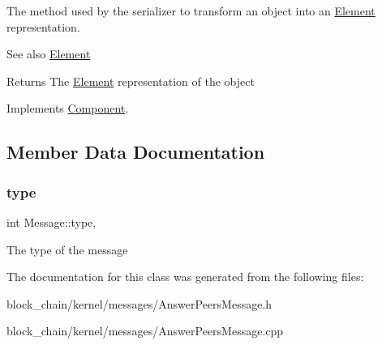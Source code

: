 The method used by the serializer to transform an object into an \mbox{\hyperlink{classElement}{Element}} representation. \begin{DoxySeeAlso}{See also}
\mbox{\hyperlink{classElement}{Element}}
\end{DoxySeeAlso}
\begin{DoxyReturn}{Returns}
The \mbox{\hyperlink{classElement}{Element}} representation of the object 
\end{DoxyReturn}


Implements \mbox{\hyperlink{classComponent_a3e63d8c993e417a4af3f56d65ebfc7ea}{Component}}.



\subsection{Member Data Documentation}
\mbox{\label{classMessage_afbfb481c98b13d0deba0bac443bebe29}} 
\subsubsection{\texorpdfstring{type}{type}}
{\footnotesize\ttfamily int Message\+::type\hspace{0.3cm}{\ttfamily [protected]}, {\ttfamily [inherited]}}

The type of the message 

The documentation for this class was generated from the following files\+:\begin{DoxyCompactItemize}
\item 
block\+\_\+chain/kernel/messages/Answer\+Peers\+Message.\+h\item 
block\+\_\+chain/kernel/messages/Answer\+Peers\+Message.\+cpp\end{DoxyCompactItemize}
